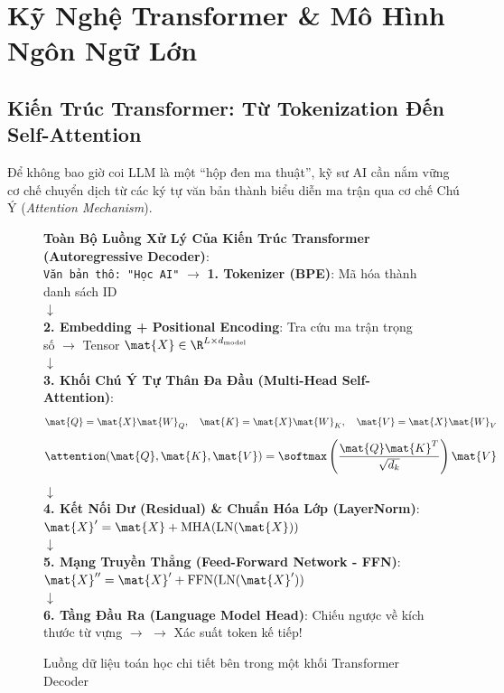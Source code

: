 
\chapter{Kỹ Nghệ Transformer \& Mô Hình Ngôn Ngữ Lớn}
\label{ch:phase3-llm}

\section{Kiến Trúc Transformer: Từ Tokenization Đến Self-Attention}
\label{sec:llm-transformer-core}

Để không bao giờ coi LLM là một ``hộp đen ma thuật'', kỹ sư AI cần nắm vững cơ chế chuyển dịch từ các ký tự văn bản thành biểu diễn ma trận qua cơ chế Chú Ý (\textit{Attention Mechanism}).

\begin{figure}[htbp]
\centering
\begin{tcolorbox}[colback=boxbg,colframe=primarycolor,width=0.95\textwidth,arc=2pt]
\small
\textbf{Toàn Bộ Luồng Xử Lý Của Kiến Trúc Transformer (Autoregressive Decoder)}:\\[0.2cm]
\texttt{Văn bản thô: "Học AI"} $\longrightarrow$ \textbf{1. Tokenizer (BPE)}: Mã hóa thành danh sách ID \code{[1824, 9510]}\\
$\downarrow$\\
\textbf{2. Embedding + Positional Encoding}: Tra cứu ma trận trọng số $\longrightarrow$ Tensor $\mat{X} \in \R^{L \times d_{\text{model}}}$\\
$\downarrow$\\
\textbf{3. Khối Chú Ý Tự Thân Đa Đầu (Multi-Head Self-Attention)}:
\[
\mat{Q} = \mat{X}\mat{W}_Q, \quad \mat{K} = \mat{X}\mat{W}_K, \quad \mat{V} = \mat{X}\mat{W}_V
\]
\[
\attention(\mat{Q}, \mat{K}, \mat{V}) = \softmax\left(\frac{\mat{Q}\mat{K}^T}{\sqrt{d_k}}\right)\mat{V}
\]
$\downarrow$\\
\textbf{4. Kết Nối Dư (Residual) \& Chuẩn Hóa Lớp (LayerNorm)}: $\mat{X}' = \mat{X} + \text{MHA}(\text{LN}(\mat{X}))$\\
$\downarrow$\\
\textbf{5. Mạng Truyền Thẳng (Feed-Forward Network - FFN)}: $\mat{X}'' = \mat{X}' + \text{FFN}(\text{LN}(\mat{X}'))$\\
$\downarrow$\\
\textbf{6. Tầng Đầu Ra (Language Model Head)}: Chiếu ngược về kích thước từ vựng $\longrightarrow$  $\longrightarrow$ Xác suất token kế tiếp!
\end{tcolorbox}
\caption{Luồng dữ liệu toán học chi tiết bên trong một khối Transformer Decoder}
\label{fig:transformer-internals}
\end{figure}

